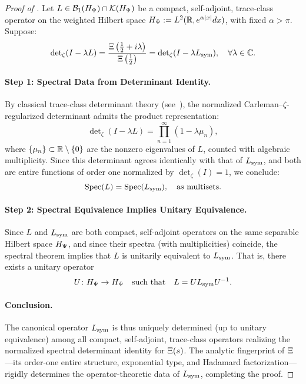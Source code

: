 \begin{proof}[Proof of ]
Let \( L \in \mathcal{B}_1(H_{\Psi}) \cap \mathcal{K}(H_{\Psi}) \) be a compact, self-adjoint, trace-class operator on the weighted Hilbert space \( H_{\Psi} := L^2(\mathbb{R}, e^{\alpha|x|}dx) \), with fixed \( \alpha > \pi \). Suppose:
\[
\det\nolimits_\zeta(I - \lambda L) = \frac{\Xi\left(\tfrac{1}{2} + i\lambda\right)}{\Xi\left(\tfrac{1}{2}\right)}
= \det\nolimits_\zeta(I - \lambda L_{\mathrm{sym}}),
\quad \forall \lambda \in \mathbb{C}.
\]

\paragraph{Step 1: Spectral Data from Determinant Identity.}
By classical trace-class determinant theory (see~\cite[Thm. 4.2]{Simon2005TraceIdeals}), the normalized Carleman–\(\zeta\)-regularized determinant admits the product representation:
\[
\det\nolimits_\zeta(I - \lambda L)
= \prod_{n=1}^\infty (1 - \lambda \mu_n),
\]
where \( \{ \mu_n \} \subset \mathbb{R} \setminus \{0\} \) are the nonzero eigenvalues of \( L \), counted with algebraic multiplicity. Since this determinant agrees identically with that of \( L_{\mathrm{sym}} \), and both are entire functions of order one normalized by \(\det\nolimits_\zeta(I) = 1\), we conclude:
\[
\operatorname{Spec}(L) = \operatorname{Spec}(L_{\mathrm{sym}}),
\quad \text{as multisets}.
\]

\paragraph{Step 2: Spectral Equivalence Implies Unitary Equivalence.}
Since \( L \) and \( L_{\mathrm{sym}} \) are both compact, self-adjoint operators on the same separable Hilbert space \( H_{\Psi} \), and since their spectra (with multiplicities) coincide, the spectral theorem implies that \( L \) is unitarily equivalent to \( L_{\mathrm{sym}} \). That is, there exists a unitary operator
\[
U \colon H_{\Psi} \to H_{\Psi}
\quad \text{such that} \quad
L = U L_{\mathrm{sym}} U^{-1}.
\]

\paragraph{Conclusion.}
The canonical operator \( L_{\mathrm{sym}} \) is thus uniquely determined (up to unitary equivalence) among all compact, self-adjoint, trace-class operators realizing the normalized spectral determinant identity for \( \Xi(s) \). The analytic fingerprint of \( \Xi \)—its order-one entire structure, exponential type, and Hadamard factorization—rigidly determines the operator-theoretic data of \( L_{\mathrm{sym}} \), completing the proof.
\end{proof}
